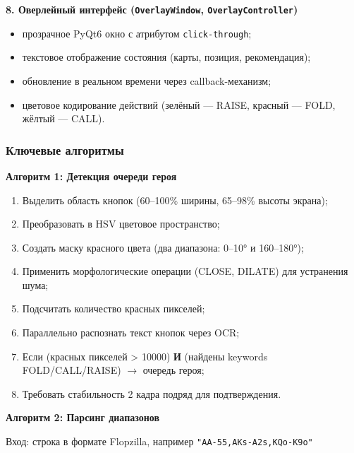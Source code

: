 \textbf{8. Оверлейный интерфейс (\texttt{OverlayWindow}, \texttt{OverlayController})}

\begin{itemize}
    \item прозрачное PyQt6 окно с атрибутом \texttt{click-through};
    \item текстовое отображение состояния (карты, позиция, рекомендация);
    \item обновление в реальном времени через callback-механизм;
    \item цветовое кодирование действий (зелёный --- RAISE, красный --- FOLD, жёлтый --- CALL).
\end{itemize}

\subsubsection*{Ключевые алгоритмы}

\textbf{Алгоритм 1: Детекция очереди героя}

\begin{enumerate}
    \item Выделить область кнопок (60--100\% ширины, 65--98\% высоты экрана);
    \item Преобразовать в HSV цветовое пространство;
    \item Создать маску красного цвета (два диапазона: 0--10° и 160--180°);
    \item Применить морфологические операции (CLOSE, DILATE) для устранения шума;
    \item Подсчитать количество красных пикселей;
    \item Параллельно распознать текст кнопок через OCR;
    \item Если (красных пикселей > 10000) \textbf{И} (найдены keywords FOLD/CALL/RAISE) $\rightarrow$ очередь героя;
    \item Требовать стабильность 2 кадра подряд для подтверждения.
\end{enumerate}

\textbf{Алгоритм 2: Парсинг диапазонов}

Вход: строка в формате Flopzilla, например \texttt{"AA-55,AKs-A2s,KQo-K9o"}

